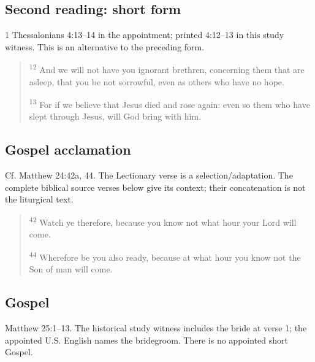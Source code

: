 \subsection{Second reading: short form}
\label{proper-second-reading-short}
1 Thessalonians 4:13--14 in the appointment; printed 4:12--13 in this study witness. This is an alternative to the preceding form.

\begin{quote}
\textsuperscript{12} And we will not have you ignorant brethren, concerning them that are asleep, that you be not sorrowful, even as others who have no hope.

\textsuperscript{13} For if we believe that Jesus died and rose again: even so them who have slept through Jesus, will God bring with him.
\end{quote}


\subsection{Gospel acclamation}
\label{proper-acclamation}
Cf. Matthew 24:42a, 44. The Lectionary verse is a selection/adaptation. The complete biblical source verses below give its context; their concatenation is not the liturgical text.

\begin{quote}
\textsuperscript{42} Watch ye therefore, because you know not what hour your Lord will come.

\textsuperscript{44} Wherefore be you also ready, because at what hour you know not the Son of man will come.
\end{quote}


\subsection{Gospel}
\label{proper-gospel}
Matthew 25:1--13. The historical study witness includes the bride at verse 1; the appointed U.S. English names the bridegroom. There is no appointed short Gospel.


